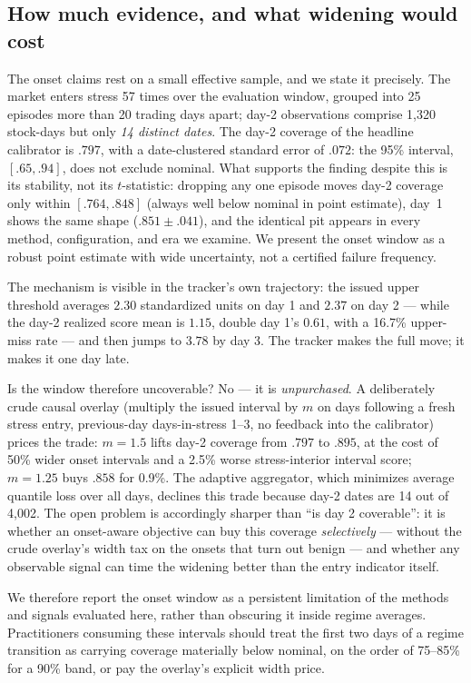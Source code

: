 \subsection{How much evidence, and what widening would cost}
\label{sec:onset-pareto}

The onset claims rest on a small effective sample, and we state it
precisely. The market enters stress 57 times over the evaluation window,
grouped into 25 episodes more than 20 trading days apart; day-2
observations comprise 1{,}320 stock-days but only \emph{14 distinct
dates}. The day-2 coverage of the headline calibrator is $.797$, with a
date-clustered standard error of $.072$: the 95\% interval,
$[.65, .94]$, does not exclude nominal. What supports the finding
despite this is its stability, not its $t$-statistic: dropping any one
episode moves day-2 coverage only within $[.764, .848]$ (always well
below nominal in point estimate), day~1 shows the same shape
($.851 \pm .041$), and the identical pit appears in every method,
configuration, and era we examine. We present the onset window as a
robust point estimate with wide uncertainty, not a certified failure
frequency.

The mechanism is visible in the tracker's own trajectory: the issued
upper threshold averages $2.30$ standardized units on day 1 and $2.37$
on day 2 --- while the day-2 realized score mean is $1.15$, double day
1's $0.61$, with a 16.7\% upper-miss rate --- and then jumps to $3.78$
by day 3. The tracker makes the full move; it makes it one day late.

Is the window therefore uncoverable? No --- it is \emph{unpurchased}. A
deliberately crude causal overlay (multiply the issued interval by $m$
on days following a fresh stress entry, previous-day days-in-stress
1--3, no feedback into the calibrator) prices the trade: $m = 1.5$
lifts day-2 coverage from $.797$ to $.895$, at the cost of 50\% wider
onset intervals and a 2.5\% worse stress-interior interval score;
$m = 1.25$ buys $.858$ for 0.9\%. The adaptive aggregator, which
minimizes average quantile loss over all days, declines this trade
because day-2 dates are 14 out of 4{,}002. The open problem is
accordingly sharper than ``is day 2 coverable'': it is whether an
onset-aware objective can buy this coverage \emph{selectively} ---
without the crude overlay's width tax on the onsets that turn out
benign --- and whether any observable signal can time the widening
better than the entry indicator itself.

We therefore report the onset window as a persistent limitation of the
methods and signals evaluated here, rather than obscuring it inside
regime averages. Practitioners consuming these intervals should treat
the first two days of a regime transition as carrying coverage
materially below nominal, on the order of 75--85\% for a 90\% band, or
pay the overlay's explicit width price.
